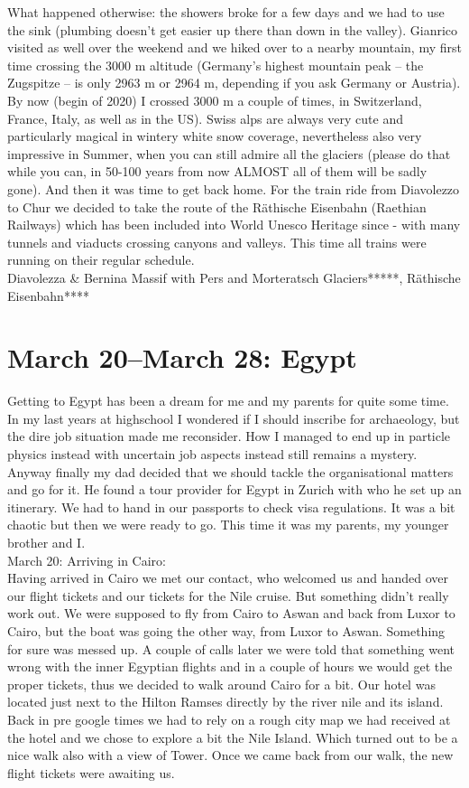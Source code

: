  What happened otherwise: the showers broke for a few days and we had to use the sink (plumbing doesn't get easier up there than down in the valley). Gianrico visited as well over the weekend and we hiked over to a nearby mountain, my first time crossing the 3000 m altitude (Germany's highest mountain peak -- the Zugspitze -- is only 2963 m or 2964 m, depending if you ask Germany or Austria). By now (begin of 2020) I crossed 3000 m a couple of times, in Switzerland, France, Italy, as well as in the US). Swiss alps are always very cute and particularly magical in wintery white snow coverage, nevertheless also very impressive in Summer, when you can still admire all the glaciers (please do that while you can, in 50-100 years from now ALMOST all of them will be sadly gone). And then it was time to get back home. For the train ride from Diavolezzo to Chur we decided to take the route of the R\"athische Eisenbahn (Raethian Railways) which has been included into World Unesco Heritage since - with many tunnels and viaducts crossing canyons and valleys. This time all trains were running on their regular schedule.\\
 
 Diavolezza \& Bernina Massif with Pers and Morteratsch Glaciers*****, R\"athische Eisenbahn****

\section{March 20--March 28: Egypt}
\label{2005:Egypt}

Getting to Egypt has been a dream for me and my parents for quite some time. In my last years at highschool I wondered if I should inscribe for archaeology, but the dire job situation made me reconsider. How I managed to end up in particle physics instead with uncertain job aspects instead still remains a mystery. Anyway finally my dad decided that we should tackle the organisational matters and go for it. He found a tour provider for Egypt in Zurich with who he set up an itinerary. We had to hand in our passports to check visa regulations. It was a bit chaotic but then we were ready to go. This time it was my parents, my younger brother and I.\\

March 20: Arriving in Cairo:\\
Having arrived in Cairo we met our contact, who welcomed us and handed over our flight tickets and our tickets for the Nile cruise. But something didn't really work out. We were supposed to fly from Cairo to Aswan and back from Luxor to Cairo, but the boat was going the other way, from Luxor to Aswan. Something for sure was messed up. A couple of calls later we were told that something went wrong with the inner Egyptian flights and in a couple of hours we would get the proper tickets, thus we decided to walk around Cairo for a bit. Our hotel was located just next to the Hilton Ramses directly by the river nile and its island. Back in pre google times we had to rely on a rough city map we had received at the hotel and we chose to explore a bit the Nile Island. Which turned out to be a nice walk also with a view of Tower. Once we came back from our walk, the new flight tickets were awaiting us.\\

